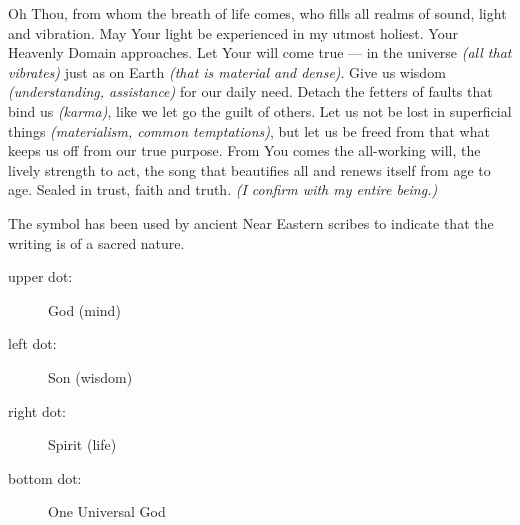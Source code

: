   \begin{translation}\justifycenter
    \vspace{-2em} %
    Oh Thou, from whom the breath of life comes,
    who fills all realms of sound, light and vibration.
    \vspace{1em} %
    May Your light be experienced in my utmost holiest.
    \vspace{1.5em} %
    Your Heavenly Domain approaches.
    \vspace{0.5em} %
    Let Your will come true --- in the universe \emph{(all that vibrates)}
    just as on Earth \emph{(that is material and dense)}.
    \vspace{0.5em} %
    Give us wisdom \emph{(understanding, assistance)}
    for our daily need.
    \vspace{0.5em} %
    Detach the fetters of faults that bind us \emph{(karma)},
    like we let go the guilt of others.
    \vspace{1em} %
    Let us not be lost in superficial things
    \emph{(materialism, common temptations)},
    \vspace{0.5em} %
    but let us be freed from that what keeps us off from
    our true purpose.
    \vspace{0.5em} %
    From You comes the all-working will, the lively strength to act,
    the song that beautifies all and renews itself from age to age.
    \vspace{1em} %
    Sealed in trust, faith and truth.
    \emph{(I confirm with my entire being.)}
  \end{translation}
  \begin{explanation}
    The symbol has been used by ancient Near Eastern scribes to indicate that
    the writing is of a sacred nature.
    \begin{description}
      \item[upper dot:] God (mind)
      \item[left dot:] Son (wisdom)
      \item[right dot:] Spirit (life)
      \item[bottom dot:] One Universal God
    \end{description}
  \end{explanation}
\endsong



